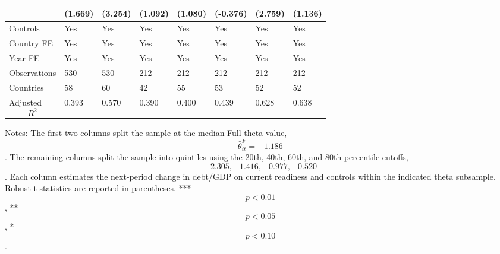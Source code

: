 \begin{table}[H]
\begin{threeparttable}
\begin{tabularx}{\textwidth}{lYYYYYYY}
  & (1.669) & (3.254) & (1.092) & (1.080) & (-0.376) & (2.759) & (1.136) \\
\midrule
Controls & Yes & Yes & Yes & Yes & Yes & Yes & Yes \\
Country FE & Yes & Yes & Yes & Yes & Yes & Yes & Yes \\
Year FE & Yes & Yes & Yes & Yes & Yes & Yes & Yes \\
Observations & 530 & 530 & 212 & 212 & 212 & 212 & 212 \\
Countries & 58 & 60 & 42 & 55 & 53 & 52 & 52 \\
Adjusted $$R^2$$ & 0.393 & 0.570 & 0.390 & 0.400 & 0.439 & 0.628 & 0.638 \\
\bottomrule
\end{tabularx}
\begin{tablenotes}[flushleft]\footnotesize
\item Notes: The first two columns split the sample at the median Full-theta value, $$\widehat{\theta}^{F}_{it}=-1.186$$. The remaining columns split the sample into quintiles using the 20th, 40th, 60th, and 80th percentile cutoffs, $$-2.305, -1.416, -0.977, -0.520$$. Each column estimates the next-period change in debt/GDP on current readiness and controls within the indicated theta subsample. Robust t-statistics are reported in parentheses. *** $$p<0.01$$, ** $$p<0.05$$, * $$p<0.10$$.
\end{tablenotes}
\end{threeparttable}
\end{table}
